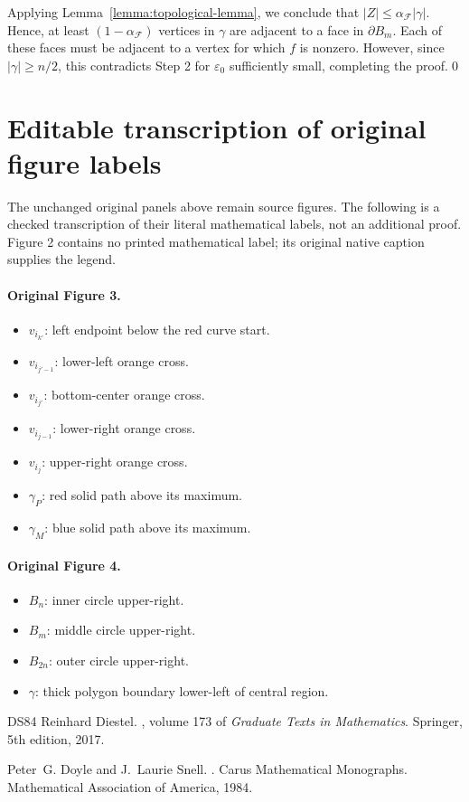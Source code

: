 \documentclass[10pt]{article}
\newcommand{\eps}{\varepsilon}
\begin{document}
Applying Lemma~\ref{lemma:topological-lemma}, we conclude that $|Z| \leq \alpha_{\mathcal{F}} |\gamma|$.
Hence, at least $(1- \alpha_{\mathcal{F}} )$ vertices in $\gamma$ are adjacent to a face in $\partial B_{m}$.
Each of these faces must be adjacent to a vertex for which $f$ is nonzero.
However, since $|\gamma| \geq n/2$, this contradicts Step 2 for $\eps_0$ sufficiently small, completing the proof.\qed
\clearpage
\section*{Editable transcription of original figure labels}
\noindent The unchanged original panels above remain source figures. The following is a checked transcription of their literal mathematical labels, not an additional proof. Figure 2 contains no printed mathematical label; its original native caption supplies the legend.
\paragraph{Original Figure 3.}
\begin{itemize}
\item $v_{i_{k'}}$: left endpoint below the red curve start.
\item $v_{i_{j'-1}}$: lower-left orange cross.
\item $v_{i_{j'}}$: bottom-center orange cross.
\item $v_{i_{j-1}}$: lower-right orange cross.
\item $v_{i_j}$: upper-right orange cross.
\item $\gamma_P$: red solid path above its maximum.
\item $\gamma_M$: blue solid path above its maximum.
\end{itemize}
\paragraph{Original Figure 4.}
\begin{itemize}
\item $B_n$: inner circle upper-right.
\item $B_m$: middle circle upper-right.
\item $B_{2n}$: outer circle upper-right.
\item $\gamma$: thick polygon boundary lower-left of central region.
\end{itemize}
\begin{thebibliography}{DS84}
Reinhard Diestel.
, volume 173 of {\em Graduate Texts in
  Mathematics}.
\newblock Springer, 5th edition, 2017.

Peter~G. Doyle and J.~Laurie Snell.
.
\newblock Carus Mathematical Monographs. Mathematical Association of America,
  1984.

\end{thebibliography}
\end{document}
